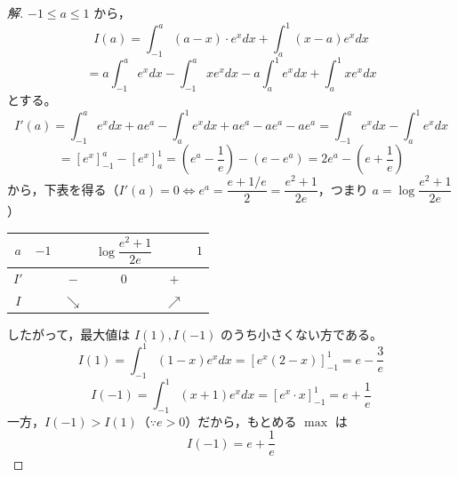 \documentclass[../main.tex]{subfiles}
\begin{document}
\begin{proof}[解]
  $-1\le a\le1$ から，
  \[
    I(a)=\int_{-1}^a(a-x)\cdot e^xdx+\int_a^1(x-a)e^xdx
  \]
  \[
    =a\int_{-1}^ae^xdx-\int_{-1}^axe^xdx-a\int_a^1e^xdx+\int_a^1xe^xdx
  \]
  とする。
  \[
    I'(a)=\int_{-1}^ae^xdx+ae^a-\int_a^1e^xdx+ae^a-ae^a-ae^a = \int_{-1}^ae^xdx-\int_a^1e^xdx
  \]
  \[
    =\left[e^x\right]_{-1}^a-\left[e^x\right]_a^1=\left(e^a-\frac1e\right)-(e-e^a)=2e^a-\left(e+\frac1e\right)
  \]
  から，下表を得る（$I'(a)=0\iff e^a=\dfrac{e+1/e}{2}=\dfrac{e^2+1}{2e}$，つまり $a=\log\dfrac{e^2+1}{2e}$）

  \begin{center}
    \begin{tabular}{c|c|c|c|c|c}
      $a$ & $-1$ & & $\log\dfrac{e^2+1}{2e}$ & & $1$ \\
      \hline
      $I'$ & & $-$ & $0$ & $+$ & \\
      \hline
      $I$ & & $\searrow$ & & $\nearrow$ &
    \end{tabular}
  \end{center}

  したがって，最大値は $I(1), I(-1)$ のうち小さくない方である。
  \[
    I(1)=\int_{-1}^1(1-x)e^xdx=\left[e^x(2-x)\right]_{-1}^1=e-\frac3e
  \]
  \[
    I(-1)=\int_{-1}^1(x+1)e^xdx=\left[e^x\cdot x\right]_{-1}^1=e+\frac1e
  \]
  一方，$I(-1)>I(1)$（$\because e>0$）だから，もとめる $\max$ は
  \[
    I(-1)=e+\frac1e
  \]
\end{proof}
\end{document}
